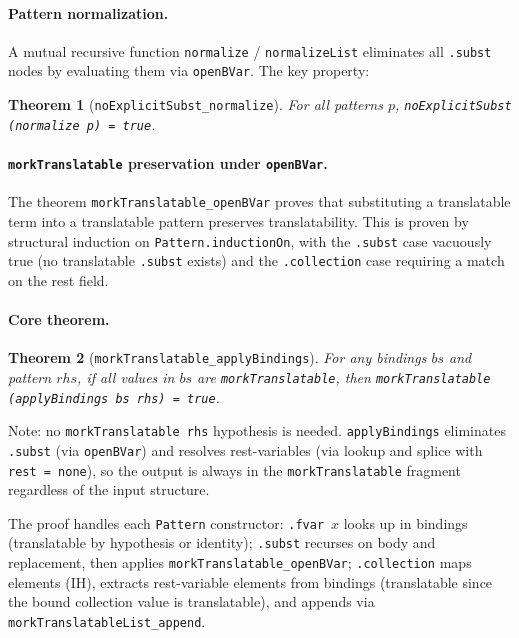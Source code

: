 \documentclass[11pt]{article}
\newtheorem{theorem}{Theorem}[section]
\theoremstyle{definition}
\theoremstyle{remark}
\begin{document}
\paragraph{Pattern normalization.}
A mutual recursive function \texttt{normalize} / \texttt{normalizeList}
eliminates all \texttt{.subst} nodes by evaluating them via
\texttt{openBVar}.  The key property:

\begin{theorem}[\texttt{noExplicitSubst\_normalize}]
For all patterns $p$,
\texttt{noExplicitSubst (normalize p) = true}.
\end{theorem}

\paragraph{\texttt{morkTranslatable} preservation under \texttt{openBVar}.}
The theorem \texttt{morkTranslatable\_openBVar} proves that substituting
a translatable term into a translatable pattern preserves translatability.
This is proven by structural induction on \texttt{Pattern.inductionOn},
with the \texttt{.subst} case vacuously true (no translatable
\texttt{.subst} exists) and the \texttt{.collection} case requiring a
match on the rest field.

\paragraph{Core theorem.}
\begin{theorem}[\texttt{morkTranslatable\_applyBindings}]
\label{thm:applyBindings}
For any bindings $\mathit{bs}$ and pattern $\mathit{rhs}$, if
all values in $\mathit{bs}$ are \texttt{morkTranslatable}, then
\texttt{morkTranslatable (applyBindings bs rhs) = true}.
\end{theorem}

\noindent
Note: no \texttt{morkTranslatable rhs} hypothesis is needed.
\texttt{applyBindings} eliminates \texttt{.subst} (via \texttt{openBVar})
and resolves rest-variables (via lookup and splice with
\texttt{rest = none}), so the output is always in the
\texttt{morkTranslatable} fragment regardless of the input structure.

The proof handles each \texttt{Pattern} constructor:
\texttt{.fvar}~$x$ looks up in bindings (translatable by hypothesis
or identity); \texttt{.subst} recurses on body and replacement, then
applies \texttt{morkTranslatable\_openBVar}; \texttt{.collection}
maps elements (IH), extracts rest-variable elements from bindings
(translatable since the bound collection value is translatable),
and appends via \texttt{morkTranslatableList\_append}.
\end{document}
